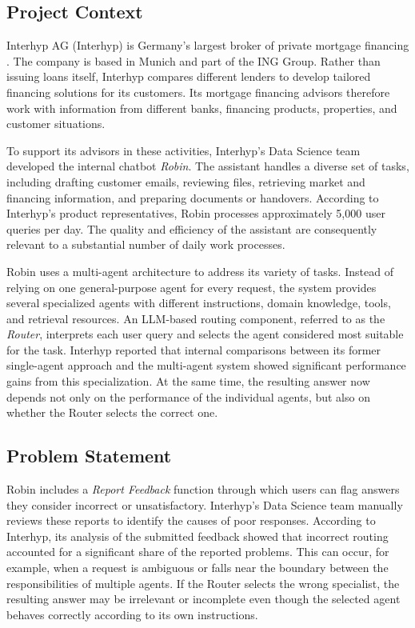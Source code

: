 \label{sec:introduction}

\subsection{Project Context}\label{sec:project-context}

Interhyp AG (Interhyp) is Germany's largest broker of private mortgage financing \autocite{interhyp-about}. The company is based in Munich and part of the ING Group. Rather than issuing loans itself, Interhyp compares different lenders to develop tailored financing solutions for its customers. Its mortgage financing advisors therefore work with information from different banks, financing products, properties, and customer situations.

To support its advisors in these activities, Interhyp's Data Science team developed the internal chatbot \emph{Robin}. The assistant handles a diverse set of tasks, including drafting customer emails, reviewing files, retrieving market and financing information, and preparing documents or handovers. According to Interhyp's product representatives, Robin processes approximately 5,000 user queries per day. The quality and efficiency of the assistant are consequently relevant to a substantial number of daily work processes.

Robin uses a multi-agent architecture to address its variety of tasks. Instead of relying on one general-purpose agent for every request, the system provides several specialized agents with different instructions, domain knowledge, tools, and retrieval resources. An LLM-based routing component, referred to as the \emph{Router}, interprets each user query and selects the agent considered most suitable for the task. Interhyp reported that internal comparisons between its former single-agent approach and the multi-agent system showed significant performance gains from this specialization. At the same time, the resulting answer now depends not only on the performance of the individual agents, but also on whether the Router selects the correct one.

\subsection{Problem Statement}\label{sec:problem-statement}

Robin includes a \emph{Report Feedback} function through which users can flag answers they consider incorrect or unsatisfactory. Interhyp's Data Science team manually reviews these reports to identify the causes of poor responses. According to Interhyp, its analysis of the submitted feedback showed that incorrect routing accounted for a significant share of the reported problems. This can occur, for example, when a request is ambiguous or falls near the boundary between the responsibilities of multiple agents. If the Router selects the wrong specialist, the resulting answer may be irrelevant or incomplete even though the selected agent behaves correctly according to its own instructions.

